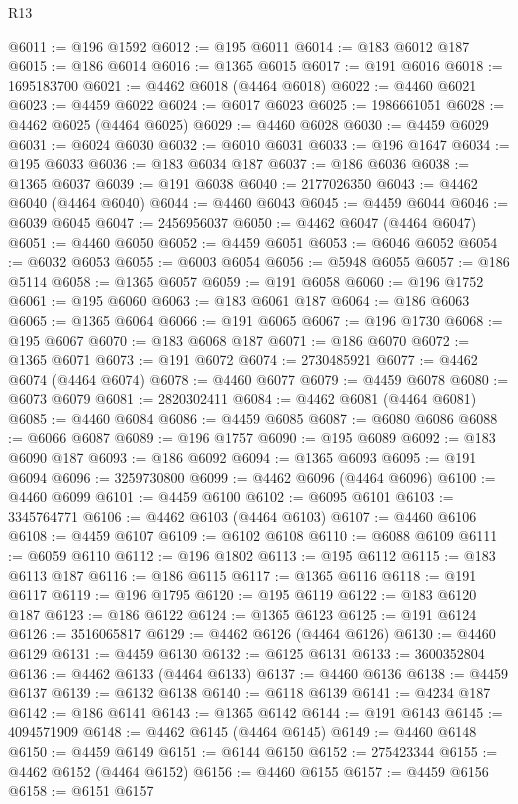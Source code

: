 \begin{lexlean}{R13}
\begin{coremodule}
@6011 := @196 @1592
@6012 := @195 @6011
@6014 := @183 @6012 @187
@6015 := @186 @6014
@6016 := @1365 @6015
@6017 := @191 @6016
@6018 := 1695183700
@6021 := @4462 @6018 (@4464 @6018)
@6022 := @4460 @6021
@6023 := @4459 @6022
@6024 := @6017 @6023
@6025 := 1986661051
@6028 := @4462 @6025 (@4464 @6025)
@6029 := @4460 @6028
@6030 := @4459 @6029
@6031 := @6024 @6030
@6032 := @6010 @6031
@6033 := @196 @1647
@6034 := @195 @6033
@6036 := @183 @6034 @187
@6037 := @186 @6036
@6038 := @1365 @6037
@6039 := @191 @6038
@6040 := 2177026350
@6043 := @4462 @6040 (@4464 @6040)
@6044 := @4460 @6043
@6045 := @4459 @6044
@6046 := @6039 @6045
@6047 := 2456956037
@6050 := @4462 @6047 (@4464 @6047)
@6051 := @4460 @6050
@6052 := @4459 @6051
@6053 := @6046 @6052
@6054 := @6032 @6053
@6055 := @6003 @6054
@6056 := @5948 @6055
@6057 := @186 @5114
@6058 := @1365 @6057
@6059 := @191 @6058
@6060 := @196 @1752
@6061 := @195 @6060
@6063 := @183 @6061 @187
@6064 := @186 @6063
@6065 := @1365 @6064
@6066 := @191 @6065
@6067 := @196 @1730
@6068 := @195 @6067
@6070 := @183 @6068 @187
@6071 := @186 @6070
@6072 := @1365 @6071
@6073 := @191 @6072
@6074 := 2730485921
@6077 := @4462 @6074 (@4464 @6074)
@6078 := @4460 @6077
@6079 := @4459 @6078
@6080 := @6073 @6079
@6081 := 2820302411
@6084 := @4462 @6081 (@4464 @6081)
@6085 := @4460 @6084
@6086 := @4459 @6085
@6087 := @6080 @6086
@6088 := @6066 @6087
@6089 := @196 @1757
@6090 := @195 @6089
@6092 := @183 @6090 @187
@6093 := @186 @6092
@6094 := @1365 @6093
@6095 := @191 @6094
@6096 := 3259730800
@6099 := @4462 @6096 (@4464 @6096)
@6100 := @4460 @6099
@6101 := @4459 @6100
@6102 := @6095 @6101
@6103 := 3345764771
@6106 := @4462 @6103 (@4464 @6103)
@6107 := @4460 @6106
@6108 := @4459 @6107
@6109 := @6102 @6108
@6110 := @6088 @6109
@6111 := @6059 @6110
@6112 := @196 @1802
@6113 := @195 @6112
@6115 := @183 @6113 @187
@6116 := @186 @6115
@6117 := @1365 @6116
@6118 := @191 @6117
@6119 := @196 @1795
@6120 := @195 @6119
@6122 := @183 @6120 @187
@6123 := @186 @6122
@6124 := @1365 @6123
@6125 := @191 @6124
@6126 := 3516065817
@6129 := @4462 @6126 (@4464 @6126)
@6130 := @4460 @6129
@6131 := @4459 @6130
@6132 := @6125 @6131
@6133 := 3600352804
@6136 := @4462 @6133 (@4464 @6133)
@6137 := @4460 @6136
@6138 := @4459 @6137
@6139 := @6132 @6138
@6140 := @6118 @6139
@6141 := @4234 @187
@6142 := @186 @6141
@6143 := @1365 @6142
@6144 := @191 @6143
@6145 := 4094571909
@6148 := @4462 @6145 (@4464 @6145)
@6149 := @4460 @6148
@6150 := @4459 @6149
@6151 := @6144 @6150
@6152 := 275423344
@6155 := @4462 @6152 (@4464 @6152)
@6156 := @4460 @6155
@6157 := @4459 @6156
@6158 := @6151 @6157

\end{coremodule}
\end{lexlean}
